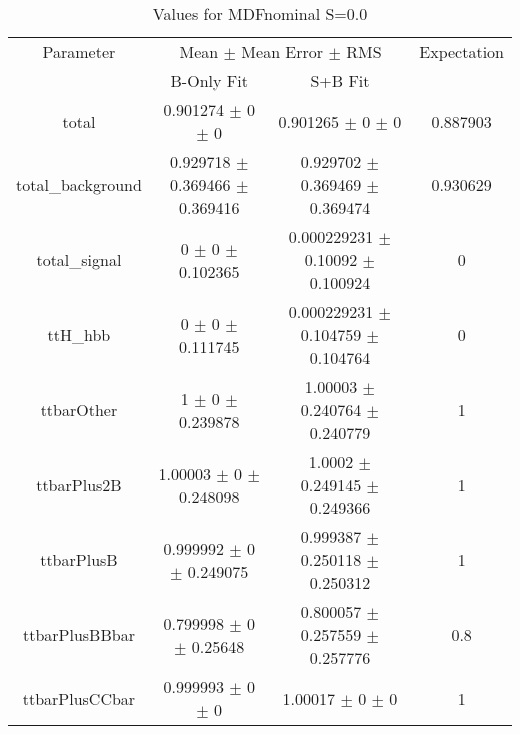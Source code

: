 \begin{table}
\centering
\caption{Values for MDFnominal S=0.0}
\begin{tabular}{cccc}
\toprule
Parameter & \multicolumn{2}{c}{Mean $\pm$ Mean Error $\pm$ RMS} & Expectation\\
 & B-Only Fit & S+B Fit & \\
\midrule
total & \num{0.901274} $\pm$ \num{0} $\pm$ \num{0} & \num{0.901265} $\pm$ \num{0} $\pm$ \num{0} & \num{0.887903}\\
total\_background & \num{0.929718} $\pm$ \num{0.369466} $\pm$ \num{0.369416} & \num{0.929702} $\pm$ \num{0.369469} $\pm$ \num{0.369474} & \num{0.930629}\\
total\_signal & \num{0} $\pm$ \num{0} $\pm$ \num{0.102365} & \num{0.000229231} $\pm$ \num{0.10092} $\pm$ \num{0.100924} & \num{0}\\
ttH\_hbb & \num{0} $\pm$ \num{0} $\pm$ \num{0.111745} & \num{0.000229231} $\pm$ \num{0.104759} $\pm$ \num{0.104764} & \num{0}\\
ttbarOther & \num{1} $\pm$ \num{0} $\pm$ \num{0.239878} & \num{1.00003} $\pm$ \num{0.240764} $\pm$ \num{0.240779} & \num{1}\\
ttbarPlus2B & \num{1.00003} $\pm$ \num{0} $\pm$ \num{0.248098} & \num{1.0002} $\pm$ \num{0.249145} $\pm$ \num{0.249366} & \num{1}\\
ttbarPlusB & \num{0.999992} $\pm$ \num{0} $\pm$ \num{0.249075} & \num{0.999387} $\pm$ \num{0.250118} $\pm$ \num{0.250312} & \num{1}\\
ttbarPlusBBbar & \num{0.799998} $\pm$ \num{0} $\pm$ \num{0.25648} & \num{0.800057} $\pm$ \num{0.257559} $\pm$ \num{0.257776} & \num{0.8}\\
ttbarPlusCCbar & \num{0.999993} $\pm$ \num{0} $\pm$ \num{0} & \num{1.00017} $\pm$ \num{0} $\pm$ \num{0} & \num{1}\\
\bottomrule
\end{tabular}
\end{table}